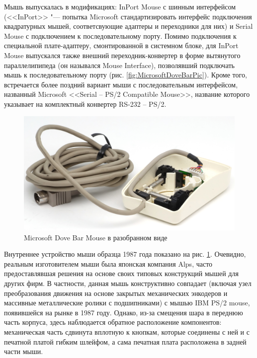 \documentclass[11pt, a4paper]{article}
\begin{document}
Мышь выпускалась в модификациях: InPort Mouse с шинным интерфейсом (<<InPort>> "--- попытка Microsoft стандартизировать интерфейс подключения квадратурных мышей, соответсвующие адаптеры и переходники для них) и Serial Mouse с подключением к последовательному порту. Помимо подключения к специальной плате-адаптеру, смонтированной в системном блоке, для InPort Mouse выпускался также внешний переходник-конвертер в форме вытянутого параллелипипеда (он назывался Mouse Interface), позволявший подключать мышь к последовательному порту (рис. \ref{fig:MicrosoftDoveBarPic}). Кроме того, встречается более поздний вариант мыши с последовательным интерфейсом, названный Microsoft <<Serial -- PS/2 Compatible Mouse>>, название которого указывает на комплектный  конвертер RS-232 -- PS/2.


\begin{figure}[h]
    \centering
    \includegraphics[scale=0.5]{1987_microsoft_dove_bar_mouse/inside1_30.jpg}
    \caption{Microsoft Dove Bar Mouse в разобранном виде}
    \label{fig:MicrosoftDoveBarInside}
\end{figure}

Внутреннее устройство мыши образца 1987 года показано на рис. \ref{fig:MicrosoftDoveBarInside}. Очевидно, реальным изготовителем мыши была японская компания Alps, часто предоставлявшая решения на основе своих типовых конструкций  мышей для других фирм. В частности, данная мышь конструктивно совпадает (включая узел преобразования движения на основе закрытых механических энкодеров и  массивные металлические ролики с подшипниками) с мышью IBM PS/2 mouse, появившейся на рынке в 1987 году. Однако, из-за смещения шара в переднюю часть корпуса, здесь наблюдается обратное расположение компонентов: механическая часть сдвинута вплотную к кнопкам, которые соединены с ней и с печатной платой гибким шлейфом, а сама печатная плата расположена в задней части мыши.
\end{document}
